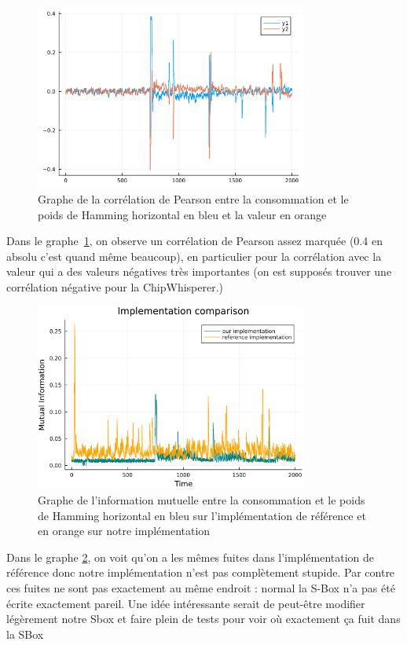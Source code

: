 \documentclass[12pt]{article}
\begin{document}
	\begin{figure}[H]
		\centering
		\includegraphics[width=0.8\textwidth]{img_files/horizontal_one_bit_corr}
		\caption{Graphe de la corrélation de Pearson entre la consommation et le poids de Hamming horizontal en bleu et la valeur en orange}
		\label{hcor}
	\end{figure}
	
	Dans le graphe \ref{hcor}, on observe un corrélation de Pearson assez marquée (0.4 en absolu c'est quand même beaucoup), en particulier pour la corrélation avec la valeur qui a des valeurs négatives très importantes (on est supposés trouver une corrélation négative pour la ChipWhisperer.)
	
	\begin{figure}[H]
		\centering
		\includegraphics[width=0.8\textwidth]{img_files/comp_ref_hHW}
		\caption{Graphe de l'information mutuelle entre la consommation et le poids de Hamming horizontal en bleu sur l'implémentation de référence et en orange sur notre implémentation}
		\label{compref}
	\end{figure}
	
	Dans le graphe \ref{compref}, on voit qu'on a les mêmes fuites dans l'implémentation de référence donc notre implémentation n'est pas complètement stupide. Par contre ces fuites ne sont pas exactement au même endroit : normal la S-Box n'a pas été écrite exactement pareil. Une idée intéressante serait de peut-être modifier légèrement notre Sbox et faire plein de tests pour voir où exactement ça fuit dans la SBox
	
\end{document}
